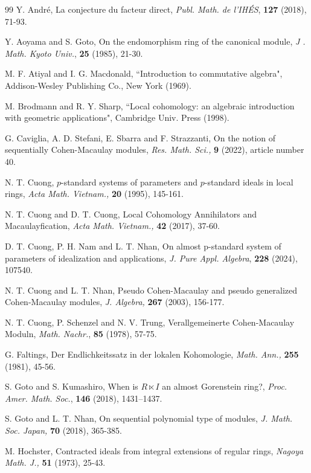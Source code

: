 \documentclass[a4papersize]{article}
\begin{document}
{\begin{thebibliography}{99}
 Y. Andr\'{e}, La conjecture du facteur direct, {\it Publ. Math. de l'IHÉS}, {\bf 127} (2018), 71-93. 			
			
 Y. Aoyama and S. Goto, On the endomorphism ring of the canonical module, {\it J . Math. Kyoto Univ.}, {\bf 25} (1985), 21-30.
			
 M. F. Atiyal and I. G. Macdonald, ``Introduction to commutative algebra",   Addison-Wesley Publishing Co., New York (1969).
			
 M. Brodmann and R. Y. Sharp, ``Local cohomology: an algebraic introduction with geometric applications", Cambridge Univ. Press (1998).
			
 G. Caviglia, A. D. Stefani, E. Sbarra and F. Strazzanti, On the notion of sequentially Cohen-Macaulay modules, {\it Res. Math. Sci.,}  {\bf 9} (2022), article number 40.
			
 N. T. Cuong, $p$-standard systems of parameters and $p$-standard ideals in local rings, {\it Acta Math. Vietnam.,} {\bf 20} (1995), 145-161.
			
 N. T. Cuong and D. T.  Cuong, Local Cohomology Annihilators and Macaulayfication, {\it Acta Math. Vietnam.,} {\bf 42} (2017), 37-60.
			
 D. T. Cuong, P. H. Nam and L. T. Nhan, On almost p-standard system of parameters of idealization and applications, {\it J. Pure Appl. Algebra}, {\bf 228} (2024), 107540.				
				
 N. T. Cuong and L. T. Nhan, Pseudo Cohen-Macaulay and pseudo generalized Cohen-Macaulay modules, {\it J. Algebra,} {\bf 267} (2003), 156-177.
			
 N. T.  Cuong, P. Schenzel and  N. V. Trung, Verallgemeinerte Cohen-Macaulay Moduln, {\it   Math. Nachr.}, {\bf 85} (1978), 57-75.
			
 G. Faltings, Der Endlichkeitssatz in der lokalen Kohomologie, {\it Math. Ann.,} {\bf 255} (1981), 45-56.
			
 S. Goto and S. Kumashiro, When is $R\ltimes I$ an almost Gorenstein ring?, {\it Proc. Amer. Math. Soc.}, {\bf 146} (2018), 1431--1437.
			
 S. Goto and  L. T. Nhan, On sequential polynomial type of modules, {\it J. Math. Soc. Japan,} {\bf 70} (2018), 365-385.	
			
 M. Hochster, Contracted ideals from integral extensions of regular rings, {\it Nagoya Math. J.,} {\bf 51} (1973), 25-43.
			

\end{thebibliography}}
\end{document}
